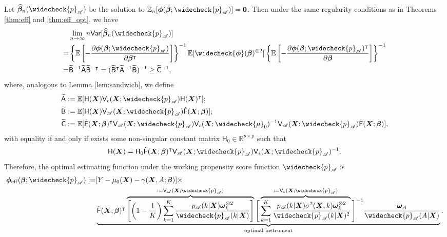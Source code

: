 \documentclass[11pt]{article}
\numberwithin{equation}{section}
\theoremstyle{definition}
\theoremstyle{remark}
\newcommand{\bX}{\bm{X}}
\newcommand{\bbeta}{\bm{\beta}}
\newcommand{\bomega}{\bm{\omega}}
\newcommand{\bphi}{\bm{\phi}}
\newcommand{\bbE}{\mathbb{E}}
\newcommand{\bbR}{\mathbb{R}}
\newcommand{\sA}{\mathscr{A}}
\newcommand{\sfA}{\mathsf{A}}
\newcommand{\sfB}{\mathsf{B}}
\newcommand{\sfC}{\mathsf{C}}
\newcommand{\sfF}{\mathsf{F}}
\newcommand{\sfH}{\mathsf{H}}
\newcommand{\sfV}{\mathsf{V}}
\newcommand{\sfvar}{\mathsf{Var}}
\newcommand{\bzero}{\mathbf{0}}	%
\newcommand{\eff}{\mathrm{eff}}
\begin{document}
Let $ \widehat{\bbeta}_{n}(\widecheck{p}_{\sA}) $ be the solution to $ \bbE_{n}[\bphi(\bbeta;\widecheck{p}_{\sA})] = \bzero $. Then under the same regularity conditions as in Theorems \ref{thm:eff} and \ref{thm:eff_opt}, we have
\begin{align*}
	&\lim_{n\to\infty}n\sfvar[\widehat{\bbeta}_{n}(\widecheck{p}_{\sA})] \\
	=& \left\{ \bbE \left[-{\partial \bphi(\bbeta;\widecheck{p}_{\sA})\over \partial \bbeta^{\intercal}}\right]\right\}^{-1}\bbE [\widecheck{\bphi}(\bbeta)^{\otimes 2}]\left\{ \bbE \left[-{\partial \bphi(\bbeta;\widecheck{p}_{\sA})^{\intercal}\over \partial \bbeta}\right]\right\}^{-1} \\
	=& \widetilde{\sfB}^{-1}\widetilde{\sfA}\widetilde{\sfB}^{-\intercal} = (\widetilde{\sfB}^{\intercal}\widetilde{\sfA}^{-1}\widetilde{\sfB})^{-1} \ge \widetilde{\sfC}^{-1},
\end{align*}
where, analogous to Lemma \ref{lem:sandwich}, we define
\begin{align*}
	\widetilde{\sfA} &:= \bbE[\sfH(\bX)\sfV_{\epsilon}(\bX;\widecheck{p}_{\sA})\sfH(\bX)^{\intercal}];\\
	\widetilde{\sfB} &:= \bbE[\sfH(\bX)\sfV_{\sA}(\bX;\widecheck{p}_{\sA})\dot{\sfF}(\bX;\bbeta)];\\
	\widetilde{\sfC} &:= \bbE[\dot{\sfF}(\bX;\bbeta)^{\intercal}\sfV_{\sA}(\bX;\widecheck{p}_{\sA})\sfV_{\epsilon}(\bX;\widecheck{\mu}_{0})^{-1}\sfV_{\sA}(\bX;\widecheck{p}_{\sA})\dot{\sfF}(\bX;\bbeta)],
\end{align*}
with equality if and only if exists some non-singular constant matrix $ \sfH_{0} \in \bbR^{p \times p} $ such that
\[ \sfH(\bX) = \sfH_{0}\dot{\sfF}(\bX;\bbeta)^{\intercal}\sfV_{\sA}(\bX;\widecheck{p}_{\sA})\sfV_{\epsilon}(\bX;\widecheck{p}_{\sA})^{-1}. \]
Therefore, the optimal estimating function under the working propensity score function $ \widecheck{p}_{\sA} $ is
\begin{align*}
	\bphi_{\eff}(\bbeta;\widecheck{p}_{\sA}) :=& [Y - \mu_{0}(\bX) - \gamma(\bX,A;\bbeta)] \times\\
	& \underbrace{\dot{\sfF}(\bX;\bbeta)^{\intercal}\overbrace{\left[ \left( 1- {1 \over K} \right)\sum_{k=1}^{K}{p_{\sA}(k|\bX)\bomega_{k}^{\otimes 2} \over \widecheck{p}_{\sA}(k|\bX)} \right]}^{:=\sfV_{\sA}(\bX;\widecheck{p}_{\sA})}\Bigg[\overbrace{\sum_{k=1}^{K}{p_{\sA}(k|\bX)\sigma^{2}(\bX,k)\bomega_{k}^{\otimes 2} \over \widecheck{p}_{\sA}(k|\bX)^{2}}}^{:=\sfV_{\epsilon}(\bX;\widecheck{p}_{\sA})}\Bigg]^{-1}{\bomega_{A} \over \widecheck{p}_{\sA}(A|\bX)}}_{\text{optimal instrument}}.
\end{align*}
\end{document}
